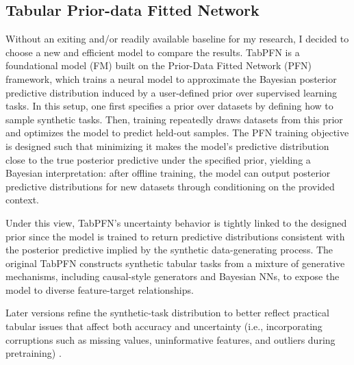 \documentclass[11pt]{article}
\begin{document}
\subsection{Tabular Prior-data Fitted Network}
\label{sec:tabpfn}

Without an exiting and/or readily available baseline for my research, I decided to choose a new and efficient model to compare the results. TabPFN is a foundational model (FM) built on the Prior-Data Fitted Network (PFN) framework, which trains a neural model to approximate the Bayesian posterior predictive distribution induced by a user-defined prior over supervised learning tasks. In this setup, one first specifies a prior over datasets by defining how to sample synthetic tasks. Then, training repeatedly draws datasets from this prior and optimizes the model to predict held-out samples. The PFN training objective is designed such that minimizing it makes the model's predictive distribution close to the true posterior predictive under the specified prior, yielding a Bayesian interpretation: after offline training, the model can output posterior predictive distributions for new datasets through conditioning on the provided context.

Under this view, TabPFN's uncertainty behavior is tightly linked to the designed prior since the model is trained to return predictive distributions consistent with the posterior predictive implied by the synthetic data-generating process. The original TabPFN constructs synthetic tabular tasks from a mixture of generative mechanisms, including causal-style generators and Bayesian NNs, to expose the model to diverse feature-target relationships.

Later versions refine the synthetic-task distribution to better reflect practical tabular issues that affect both accuracy and uncertainty (i.e., incorporating corruptions such as missing values, uninformative features, and outliers during pretraining) \cite{Hollmann2025NatureTabPFN}. 


\end{document}
